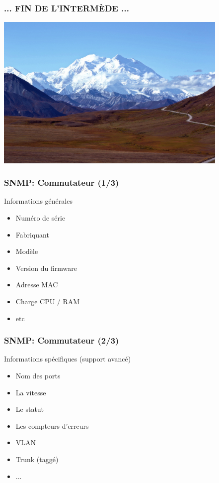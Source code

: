 \documentclass{beamer}
\begin{document}
\begin{frame}
    \frametitle{... FIN DE L'INTERM\`{E}DE ...}

    \includegraphics[height=7.5cm]{./pics/montagne.jpg}

\end{frame}



\begin{frame}
    \frametitle{SNMP: Commutateur (1/3)}

    \begin{block}{Informations générales}
    \begin{itemize}
    \item Numéro de série
    \item Fabriquant
    \item Modèle
    \item Version du firmware
    \item Adresse MAC
    \item Charge CPU / RAM
    \item etc
    \end{itemize}
    \end{block}
\end{frame}

\begin{frame}
    \frametitle{SNMP: Commutateur (2/3)}

    \begin{block}{Informations spécifiques (support avancé)}
    \begin{itemize}
    \item Nom des ports 
    \item La vitesse
    \item Le statut
    \item Les compteurs d'erreurs
    \item VLAN
    \item Trunk (taggé)
    \item ...
    \end{itemize}
    \end{block}
\end{frame}
\end{document}
